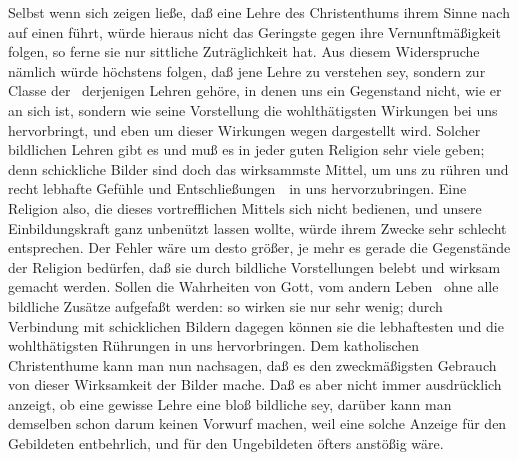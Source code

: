 \begin{aufza}
\item Selbst wenn sich zeigen ließe, daß eine Lehre des Christenthums ihrem  Sinne nach auf einen  führt, würde hieraus nicht das Geringste gegen ihre Vernunftmäßigkeit folgen, so ferne sie nur sittliche Zuträglichkeit hat. Aus diesem Widerspruche nämlich würde höchstens folgen, daß jene Lehre  zu verstehen sey, sondern zur Classe der  \dh\ derjenigen Lehren gehöre, in denen uns ein Gegenstand nicht, wie er an sich ist, sondern wie seine Vorstellung die wohlthätigsten Wirkungen bei uns hervorbringt, und eben um dieser Wirkungen wegen dargestellt wird. Solcher bildlichen Lehren gibt es und muß es in jeder guten Religion sehr viele geben; denn schickliche Bilder sind doch das wirksammste Mittel, um uns zu rühren und recht lebhafte Gefühle und Entschließungen~\ in uns hervorzubringen. Eine Religion also, die dieses vortrefflichen Mittels sich nicht bedienen, und unsere Einbildungskraft ganz unbenützt lassen wollte, würde ihrem Zwecke sehr schlecht entsprechen. Der Fehler wäre um desto größer, je mehr es gerade die  Gegenstände der Religion bedürfen, daß sie durch bildliche Vorstellungen belebt und wirksam gemacht werden. Sollen die Wahrheiten von Gott, vom andern Leben \usw\ ohne alle bildliche Zusätze aufgefaßt werden: so wirken sie nur sehr wenig; durch Verbindung mit schicklichen Bildern dagegen können sie die lebhaftesten und die wohlthätigsten Rührungen in uns hervorbringen. Dem katholischen Christenthume kann man nun nachsagen, daß es den zweckmäßigsten Gebrauch von dieser Wirksamkeit der Bilder mache. Daß es aber nicht immer ausdrücklich anzeigt, ob eine gewisse Lehre eine bloß bildliche sey, darüber kann man demselben schon darum keinen Vorwurf machen, weil eine solche Anzeige für den Gebildeten entbehrlich, und für den Ungebildeten öfters anstößig wäre.
\end{aufza}

